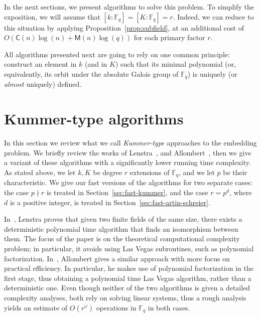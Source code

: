 \documentclass[12pt]{article}
\theoremstyle{plain}
\theoremstyle{definition}
\def\F{\ensuremath{\mathbb{F}}}
\def\MM{\ensuremath{\mathsf{M}}}
\def\CC{\ensuremath{\mathsf{C}}}
\newcounter{algorithm}
\begin{document}
In the next sections, we present algorithms to solve this problem. To
simplify the exposition, we will assume that $[k:\F_q]=[K:\F_q]=r$.
Indeed, we can reduce to this situation by applying
Proposition~\ref{prop:subfield}, at an additional cost of
$O(\CC(n)\log(n) + \MM(n)\log(q))$ for each primary factor $r$.

All algorithms presented next are going to rely on one common
principle: construct an element in $k$ (and in $K$) such that its
minimal polynomial (or, equivalently, its orbit under the absolute
Galois group of $\F_q$) is uniquely (or \emph{almost} uniquely)
defined.






\section{Kummer-type algorithms}
\label{sec:kummer}

In this section we review what we call \emph{Kummer-type} approaches to the embedding problem. 
We briefly review the works of Lenstra~\cite{LenstraJr91}, and Allombert~\cite{Allombert02}, then 
we give a variant of these algorithms with a significantly lower running time complexity.
As stated above, we let $k,K$ be degree $r$ extensions of $\F_q$, and we let $p$ be their
characteristic.
We give our fast versions of the algorithms for two separate cases: the case $p \nmid r$
is treated in Section~\ref{sec:fast-kummer}, and the case $r = p^d$, where $d$ 
is a positive integer, is treated in Section~\ref{sec:fast-artin-schreier}.

In~\cite{LenstraJr91}, Lenstra proves that 
given two finite fields of the same size, there exists a deterministic polynomial time algorithm 
that finds an isomorphism between them. The focus of the paper is on the theoretical computational
complexity problem; in particular, it avoids using Las Vegas subroutines, such as polynomial
factorization. 
In~\cite{Allombert02}, Allombert gives a similar approach with more focus on practical efficiency.
In particular, he makes use of polynomial factorization in the first stage, thus obtaining a
polynomial time Las Vegas algorithm, rather than a deterministic one.
Even though neither of the two algorithms is given a detailed complexity analyses, both rely
on solving linear systems, thus a rough analysis yields an estimate of $O(r^{\omega})$ operations
in $\F_q$ in both cases.
\end{document}
